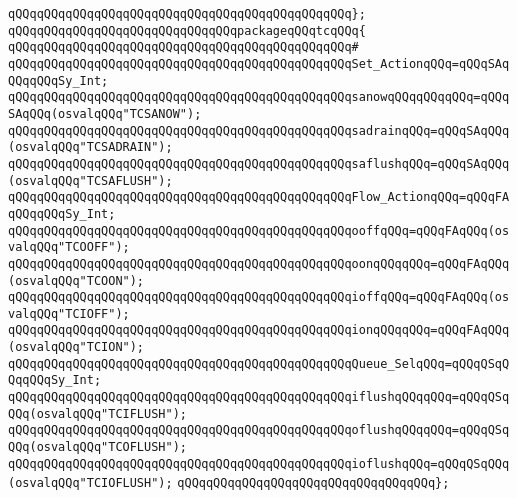 \verb|qQQqqQQqqQQqqQQqqQQqqQQqqQQqqQQqqQQqqQQqqQQqqQQq};|\newline
\newline
\verb|qQQqqQQqqQQqqQQqqQQqqQQqqQQqqQQqpackageqQQqtcqQQq{|\newline
\verb|qQQqqQQqqQQqqQQqqQQqqQQqqQQqqQQqqQQqqQQqqQQqqQQq#|\newline
\verb|qQQqqQQqqQQqqQQqqQQqqQQqqQQqqQQqqQQqqQQqqQQqqQQqSet_ActionqQQq=qQQqSAqQQqqQQqSy_Int;|\newline
\newline
\verb|qQQqqQQqqQQqqQQqqQQqqQQqqQQqqQQqqQQqqQQqqQQqqQQqsanowqQQqqQQqqQQq=qQQqSAqQQq(osvalqQQq"TCSANOW");|\newline
\verb|qQQqqQQqqQQqqQQqqQQqqQQqqQQqqQQqqQQqqQQqqQQqqQQqsadrainqQQq=qQQqSAqQQq(osvalqQQq"TCSADRAIN");|\newline
\verb|qQQqqQQqqQQqqQQqqQQqqQQqqQQqqQQqqQQqqQQqqQQqqQQqsaflushqQQq=qQQqSAqQQq(osvalqQQq"TCSAFLUSH");|\newline
\newline
\verb|qQQqqQQqqQQqqQQqqQQqqQQqqQQqqQQqqQQqqQQqqQQqqQQqFlow_ActionqQQq=qQQqFAqQQqqQQqSy_Int;|\newline
\newline
\verb|qQQqqQQqqQQqqQQqqQQqqQQqqQQqqQQqqQQqqQQqqQQqqQQqooffqQQq=qQQqFAqQQq(osvalqQQq"TCOOFF");|\newline
\verb|qQQqqQQqqQQqqQQqqQQqqQQqqQQqqQQqqQQqqQQqqQQqqQQqoonqQQqqQQq=qQQqFAqQQq(osvalqQQq"TCOON");|\newline
\verb|qQQqqQQqqQQqqQQqqQQqqQQqqQQqqQQqqQQqqQQqqQQqqQQqioffqQQq=qQQqFAqQQq(osvalqQQq"TCIOFF");|\newline
\verb|qQQqqQQqqQQqqQQqqQQqqQQqqQQqqQQqqQQqqQQqqQQqqQQqionqQQqqQQq=qQQqFAqQQq(osvalqQQq"TCION");|\newline
\newline
\verb|qQQqqQQqqQQqqQQqqQQqqQQqqQQqqQQqqQQqqQQqqQQqqQQqQueue_SelqQQq=qQQqQSqQQqqQQqSy_Int;|\newline
\newline
\verb|qQQqqQQqqQQqqQQqqQQqqQQqqQQqqQQqqQQqqQQqqQQqqQQqiflushqQQqqQQq=qQQqQSqQQq(osvalqQQq"TCIFLUSH");|\newline
\verb|qQQqqQQqqQQqqQQqqQQqqQQqqQQqqQQqqQQqqQQqqQQqqQQqoflushqQQqqQQq=qQQqQSqQQq(osvalqQQq"TCOFLUSH");|\newline
\verb|qQQqqQQqqQQqqQQqqQQqqQQqqQQqqQQqqQQqqQQqqQQqqQQqioflushqQQq=qQQqQSqQQq(osvalqQQq"TCIOFLUSH");|\newline
\verb|qQQqqQQqqQQqqQQqqQQqqQQqqQQqqQQqqQQq};|\newline

